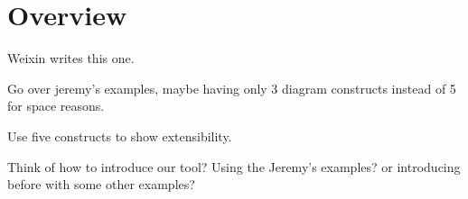 \section{Overview}

Weixin writes this one.

Go over jeremy's examples, maybe having only 3 diagram 
constructs instead of 5 for space reasons. 

Use five constructs to show extensibility.


Think of how to introduce our tool? Using the Jeremy's examples? 
or introducing before with some other examples?  
